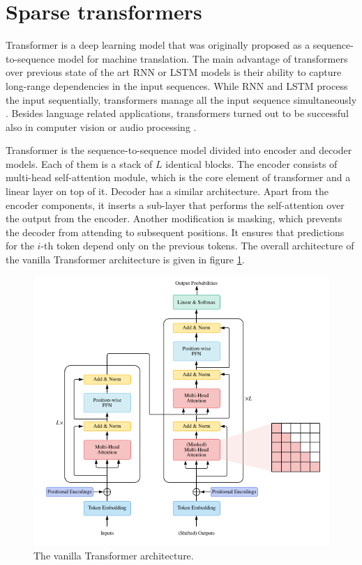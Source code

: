\documentclass[magisterska,en]{pracamgr}
\begin{document}
\section{Sparse transformers}
Transformer \cite{DBLP:conf/nips/VaswaniSPUJGKP17} is a deep learning model that was originally proposed as a sequence-to-sequence model \cite{DBLP:conf/nips/SutskeverVL14} for machine translation. The main advantage of transformers over previous state of the art RNN or LSTM models is their ability to capture long-range dependencies in the input sequences. While RNN and LSTM process the input sequentially, transformers manage all the input sequence simultaneously \cite{DBLP:journals/corr/abs-2306-07303}.
Besides language related applications, transformers turned out to be successful also in computer vision \cite{DBLP:conf/iclr/DosovitskiyB0WZ21} or audio processing \cite{DBLP:journals/corr/abs-2106-04554}. 

Transformer is the sequence-to-sequence model divided into encoder and decoder models. Each of them is a stack of $L$ identical blocks. The encoder consists of multi-head self-attention module, which is the core element of transformer and a linear layer on top of it. Decoder has a similar architecture. Apart from the encoder components, it inserts a sub-layer that performs the self-attention over the output from the encoder. Another modification is masking, which prevents the decoder from attending to subsequent positions. It ensures that predictions for the $i$-th token depend only on the previous tokens. The overall architecture of the vanilla Transformer architecture is given in figure \ref{attention}.

\begin{figure}[H]
\centering
\includegraphics[scale=0.5]{images/attention.png}
\caption{The vanilla Transformer architecture.}
\label{attention}
\end{figure}
\end{document}
